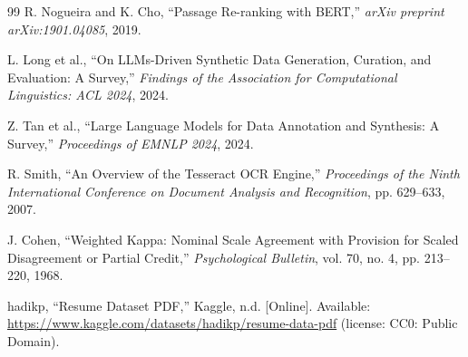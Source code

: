\documentclass[12pt,a4paper,oneside]{report}
\begin{document}
\begin{thebibliography}{99}
R. Nogueira and K. Cho,
``Passage Re-ranking with BERT,''
\emph{arXiv preprint arXiv:1901.04085}, 2019.

L. Long et al.,
``On LLMs-Driven Synthetic Data Generation, Curation, and Evaluation: A Survey,''
\emph{Findings of the Association for Computational Linguistics: ACL 2024}, 2024.

Z. Tan et al.,
``Large Language Models for Data Annotation and Synthesis: A Survey,''
\emph{Proceedings of EMNLP 2024}, 2024.

R. Smith,
``An Overview of the Tesseract OCR Engine,''
\emph{Proceedings of the Ninth International Conference on Document Analysis and Recognition}, pp. 629--633, 2007.

J. Cohen,
``Weighted Kappa: Nominal Scale Agreement with Provision for Scaled Disagreement or Partial Credit,''
\emph{Psychological Bulletin}, vol. 70, no. 4, pp. 213--220, 1968.

hadikp,
``Resume Dataset PDF,''
Kaggle, n.d. [Online]. Available: \url{https://www.kaggle.com/datasets/hadikp/resume-data-pdf} (license: CC0: Public Domain).

\end{thebibliography}
\end{document}
